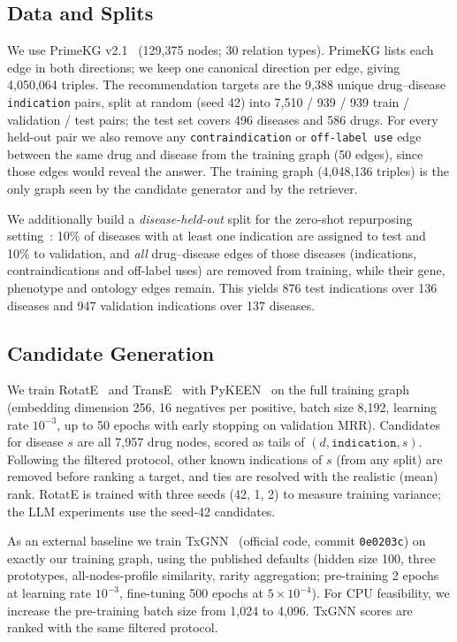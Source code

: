 \documentclass[electronics,article,submit]{Definitions/mdpi}
\begin{document}
\subsection{Data and Splits}
We use PrimeKG v2.1~\cite{chandak2023primekg} (129,375 nodes; 30 relation types). PrimeKG lists each edge in both directions; we keep one canonical direction per edge, giving 4,050,064 triples. The recommendation targets are the 9,388 unique drug--disease \texttt{indication} pairs, split at random (seed 42) into 7,510 / 939 / 939 train / validation / test pairs; the test set covers 496 diseases and 586 drugs. For every held-out pair we also remove any \texttt{contraindication} or \texttt{off-label use} edge between the same drug and disease from the training graph (50 edges), since those edges would reveal the answer. The training graph (4,048,136 triples) is the only graph seen by the candidate generator and by the retriever.

We additionally build a \emph{disease-held-out} split for the zero-shot repurposing setting~\cite{huang2024txgnn}: 10\% of diseases with at least one indication are assigned to test and 10\% to validation, and \emph{all} drug--disease edges of those diseases (indications, contraindications and off-label uses) are removed from training, while their gene, phenotype and ontology edges remain. This yields 876 test indications over 136 diseases and 947 validation indications over 137 diseases.

\subsection{Candidate Generation}
We train RotatE~\cite{sun2019rotate} and TransE~\cite{bordes2013transe} with PyKEEN~\cite{ali2021pykeen} on the full training graph (embedding dimension 256, 16 negatives per positive, batch size 8,192, learning rate $10^{-3}$, up to 50 epochs with early stopping on validation MRR). Candidates for disease $s$ are all 7,957 drug nodes, scored as tails of $(d,\texttt{indication},s)$. Following the filtered protocol, other known indications of $s$ (from any split) are removed before ranking a target, and ties are resolved with the realistic (mean) rank. RotatE is trained with three seeds (42, 1, 2) to measure training variance; the LLM experiments use the seed-42 candidates.

As an external baseline we train TxGNN~\cite{huang2024txgnn} (official code, commit \texttt{0e0203c}) on exactly our training graph, using the published defaults (hidden size 100, three prototypes, all-nodes-profile similarity, rarity aggregation; pre-training 2 epochs at learning rate $10^{-3}$, fine-tuning 500 epochs at $5\times10^{-4}$). For CPU feasibility, we increase the pre-training batch size from 1,024 to 4,096. TxGNN scores are ranked with the same filtered protocol.
\end{document}

